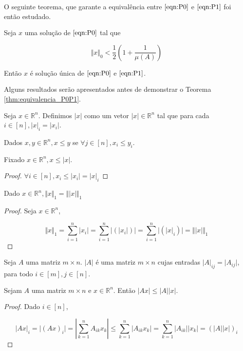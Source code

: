 O seguinte teorema, que garante a equivalência entre $\eqref{eqn:P0}$ e $\eqref{eqn:P1}$ foi então estudado.

\begin{teorema}
Seja $x$ uma solução de $\eqref{eqn:P0}$ tal que

$$ \Vert x \Vert_0 < \frac{1}{2} \left(1 + \frac{1}{\mu(A)}\right) $$

Então $x$ é solução única de $\eqref{eqn:P0}$ e $\eqref{eqn:P1}$.
\label{thm:equivalencia_P0P1}
\end{teorema}

Alguns resultados serão apresentados antes de demonstrar o Teorema \ref{thm:equivalencia_P0P1}.

\begin{definicao}
Seja $x \in \mathbb{R}^n$. Definimos $\vert x \vert$ como um vetor $\vert x \vert \in \mathbb{R}^n$ tal que para cada $i \in [n], \vert x \vert_i = \vert x_i \vert$.
\end{definicao}

\begin{definicao}
Dados $x, y \in \mathbb{R}^n, x \leq y$ se $\forall j \in [n], x_i \leq y_i$.
\end{definicao}

\begin{lema}
Fixado $x \in \mathbb{R}^n, x \leq \vert x \vert$.
\end{lema}
\begin{proof}
$ \forall i \in [n], x_i \leq \vert x_i \vert = \vert x \vert_i$
\end{proof}

\begin{lema} %
Dado $x \in \mathbb{R}^n, \Vert x \Vert_1 = \Vert \vert x \vert \Vert_1$
\end{lema}
\begin{proof}
Seja $x \in \mathbb{R}^n$,

$$\Vert x \Vert_1 = \sum_{i = 1}^n \vert x_i \vert = \sum_{i = 1}^n \vert (\vert x_i \vert) \vert
= \sum_{i = 1}^n \vert (\vert x \vert_i) \vert = \Vert \vert x \vert \Vert_1$$
\end{proof}

\begin{definicao}
Seja $A$ uma matriz $m \times n$. $\vert A \vert$ é uma matriz $m \times n$ cujas entradas $\vert A \vert_{ij} = \vert A_{ij} \vert$, para todo $i \in [m], j \in [n]$.
\end{definicao}

\begin{lema}
Sejam $A$ uma matriz $m \times n$ e $x \in \mathbb{R}^n$. Então $\vert Ax \vert \leq \vert A \vert \vert x \vert$.
\end{lema}
\begin{proof}
Dado $i \in [n]$,

$$ \vert Ax \vert_i = \vert (Ax)_i \vert = \left| \sum_{k = 1}^n A_{ik}x_k \right|
\leq  \sum_{k = 1}^n \vert A_{ik}x_k \vert 
=     \sum_{k = 1}^n \vert A_{ik} \vert \vert x_k \vert
=     (\vert A \vert \vert x \vert)_i
$$
\end{proof}

